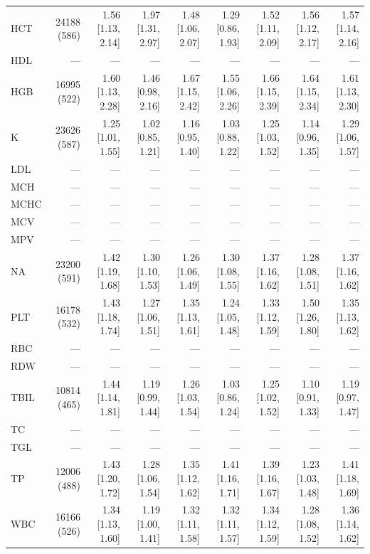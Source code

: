 \begin{table}[ht]
\begin{tabular}{lrrrrrrrr}
HCT & 24188 (586) & 1.56 [1.13, 2.14] & 1.97 [1.31, 2.97] & 1.48 [1.06, 2.07] & 1.29 [0.86, 1.93] & 1.52 [1.11, 2.09] & 1.56 [1.12, 2.17] & 1.57 [1.14, 2.16] \\
HDL & --- & --- & --- & --- & --- & --- & --- & --- \\
HGB & 16995 (522) & 1.60 [1.13, 2.28] & 1.46 [0.98, 2.16] & 1.67 [1.15, 2.42] & 1.55 [1.06, 2.26] & 1.66 [1.15, 2.39] & 1.64 [1.15, 2.34] & 1.61 [1.13, 2.30] \\
K & 23626 (587) & 1.25 [1.01, 1.55] & 1.02 [0.85, 1.21] & 1.16 [0.95, 1.40] & 1.03 [0.88, 1.22] & 1.25 [1.03, 1.52] & 1.14 [0.96, 1.35] & 1.29 [1.06, 1.57] \\
LDL & --- & --- & --- & --- & --- & --- & --- & --- \\
MCH & --- & --- & --- & --- & --- & --- & --- & --- \\
MCHC & --- & --- & --- & --- & --- & --- & --- & --- \\
MCV & --- & --- & --- & --- & --- & --- & --- & --- \\
MPV & --- & --- & --- & --- & --- & --- & --- & --- \\
NA & 23200 (591) & 1.42 [1.19, 1.68] & 1.30 [1.10, 1.53] & 1.26 [1.06, 1.49] & 1.30 [1.08, 1.55] & 1.37 [1.16, 1.62] & 1.28 [1.08, 1.51] & 1.37 [1.16, 1.62] \\
PLT & 16178 (532) & 1.43 [1.18, 1.74] & 1.27 [1.06, 1.51] & 1.35 [1.13, 1.61] & 1.24 [1.05, 1.48] & 1.33 [1.12, 1.59] & 1.50 [1.26, 1.80] & 1.35 [1.13, 1.62] \\
RBC & --- & --- & --- & --- & --- & --- & --- & --- \\
RDW & --- & --- & --- & --- & --- & --- & --- & --- \\
TBIL & 10814 (465) & 1.44 [1.14, 1.81] & 1.19 [0.99, 1.44] & 1.26 [1.03, 1.54] & 1.03 [0.86, 1.24] & 1.25 [1.02, 1.52] & 1.10 [0.91, 1.33] & 1.19 [0.97, 1.47] \\
TC & --- & --- & --- & --- & --- & --- & --- & --- \\
TGL & --- & --- & --- & --- & --- & --- & --- & --- \\
TP & 12006 (488) & 1.43 [1.20, 1.72] & 1.28 [1.06, 1.54] & 1.35 [1.12, 1.62] & 1.41 [1.16, 1.71] & 1.39 [1.16, 1.67] & 1.23 [1.03, 1.48] & 1.41 [1.18, 1.69] \\
WBC & 16166 (526) & 1.34 [1.13, 1.60] & 1.19 [1.00, 1.41] & 1.32 [1.11, 1.58] & 1.32 [1.11, 1.57] & 1.34 [1.12, 1.59] & 1.28 [1.08, 1.52] & 1.36 [1.14, 1.62] \\
\bottomrule
\end{tabular}
\label{tab:13_cox_inspire_periop_infection}
\end{table}
